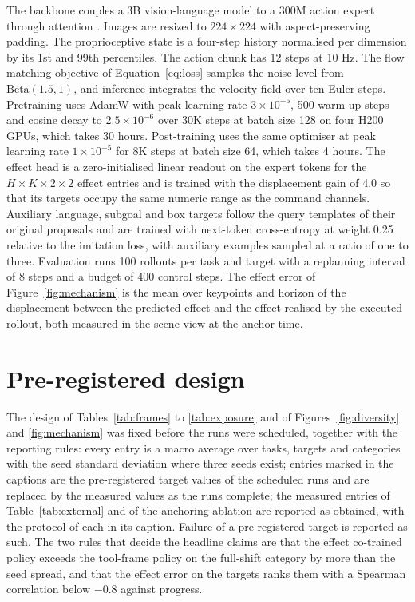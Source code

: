 The backbone couples a 3B vision-language model to a 300M action expert through attention \citep{pi2025pi05, beyer2024paligemma}. Images are resized to $224 \times 224$ with aspect-preserving padding. The proprioceptive state is a four-step history normalised per dimension by its 1st and 99th percentiles. The action chunk has 12 steps at 10 Hz. The flow matching objective of Equation~\eqref{eq:loss} samples the noise level from $\mathrm{Beta}(1.5, 1)$, and inference integrates the velocity field over ten Euler steps. Pretraining uses AdamW with peak learning rate $3 \times 10^{-5}$, 500 warm-up steps and cosine decay to $2.5 \times 10^{-6}$ over 30K steps at batch size 128 on four H200 GPUs, which takes 30 hours. Post-training uses the same optimiser at peak learning rate $1 \times 10^{-5}$ for 8K steps at batch size 64, which takes 4 hours. The effect head is a zero-initialised linear readout on the expert tokens for the $H \times K \times 2 \times 2$ effect entries and is trained with the displacement gain of 4.0 so that its targets occupy the same numeric range as the command channels. Auxiliary language, subgoal and box targets follow the query templates of their original proposals and are trained with next-token cross-entropy at weight 0.25 relative to the imitation loss, with auxiliary examples sampled at a ratio of one to three. Evaluation runs 100 rollouts per task and target with a replanning interval of 8 steps and a budget of 400 control steps. The effect error of Figure~\ref{fig:mechanism} is the mean over keypoints and horizon of the displacement between the predicted effect and the effect realised by the executed rollout, both measured in the scene view at the anchor time.

\section{Pre-registered design}
\label{app:prereg}

The design of Tables~\ref{tab:frames} to \ref{tab:exposure} and of Figures~\ref{fig:diversity} and \ref{fig:mechanism} was fixed before the runs were scheduled, together with the reporting rules: every entry is a macro average over tasks, targets and categories with the seed standard deviation where three seeds exist; entries marked \tgt{} in the captions are the pre-registered target values of the scheduled runs and are replaced by the measured values as the runs complete; the measured entries of Table~\ref{tab:external} and of the anchoring ablation are reported as obtained, with the protocol of each in its caption. Failure of a pre-registered target is reported as such. The two rules that decide the headline claims are that the effect co-trained policy exceeds the tool-frame policy on the full-shift category by more than the seed spread, and that the effect error on the targets ranks them with a Spearman correlation below $-0.8$ against progress.

